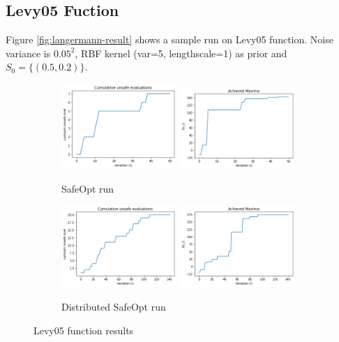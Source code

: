 \newpage
\subsection{Levy05 Fuction}
Figure \ref{fig:langermann-result} shows a sample run on Levy05 function. Noise variance is $0.05^2$, RBF kernel (var=5, lengthscale=1) as prior and $S_0=\{ (0.5, 0.2) \}$.
\begin{figure}[h!]
	\centering
	\begin{subfigure}{0.99\textwidth}
		\includegraphics[width=0.48\textwidth]{figures/results/levy05-sbo-cum-unsafe.png}
		\includegraphics[width=0.48\textwidth]{figures/results/levy05-sbo-maxima.png}
		\caption{SafeOpt run}
		\label{fig:levy05-result-sbo}
	\end{subfigure}
	\vfill
	\begin{subfigure}{0.98\textwidth}
		\includegraphics[width=0.48\textwidth]{figures/results/levy05-dbo-cum-unsafe.png}
		\includegraphics[width=0.48\textwidth]{figures/results/levy05-dbo-maxima.png}
		\caption{Distributed SafeOpt run}
		\label{fig:levy05-result-dbo}
	\end{subfigure}
	\caption{Levy05 function results}
	\label{fig:levy05-result}
\end{figure}

